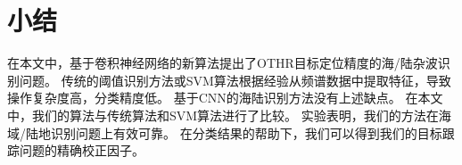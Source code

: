\section{小结}
在本文中，基于卷积神经网络的新算法提出了OTHR目标定位精度的海/陆杂波识别问题。 传统的阈值识别方法或SVM算法根据经验从频谱数据中提取特征，导致操作复杂度高，分类精度低。 基于CNN的海陆识别方法没有上述缺点。
在本文中，我们的算法与传统算法和SVM算法进行了比较。 实验表明，我们的方法在海域/陆地识别问题上有效可靠。 在分类结果的帮助下，我们可以得到我们的目标跟踪问题的精确校正因子。

